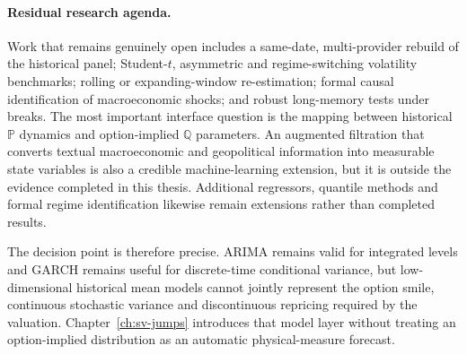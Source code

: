 \paragraph{Residual research agenda.}
Work that remains genuinely open includes a same-date, multi-provider rebuild
of the historical panel; Student-$t$, asymmetric and regime-switching
volatility benchmarks; rolling or expanding-window re-estimation; formal
causal identification of macroeconomic shocks; and robust long-memory tests
under breaks. The most important interface question is the mapping between
historical $\mathbb P$ dynamics and option-implied $\mathbb Q$ parameters.
An augmented filtration that converts textual macroeconomic and geopolitical
information into measurable state variables is also a credible machine-learning
extension, but it is outside the evidence completed in this thesis.
Additional regressors, quantile methods and formal regime identification
likewise remain extensions rather than completed results.

The decision point is therefore precise. ARIMA remains valid for integrated
levels and GARCH remains useful for discrete-time conditional variance, but
low-dimensional historical mean models cannot jointly represent the option
smile, continuous stochastic variance and discontinuous repricing required by
the valuation. Chapter~\ref{ch:sv-jumps} introduces that model layer without treating an
option-implied distribution as an automatic physical-measure forecast.
